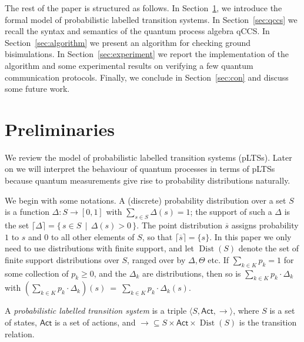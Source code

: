 \documentclass[a4paper,UKenglish,cleveref, autoref]{lipics-v2019}
\newcommand{\dist}[1]{\mathop{Dist} ({#1})   } %
\newcommand{\pdist}[1]{\overline{#1}  } %
\newcommand{\support}[1]{\lceil{#1}\rceil}
\newcommand{\Act}{\ensuremath{\mathsf{Act}}\xspace}
\newcommand{\setof}[2]{\{ \, #1 \, \mid \, #2 \, \}}%
\begin{document}
The rest of the paper is structured as follows. In Section~\ref{sec:plts}, we introduce the formal model
of probabilistic labelled transition systems. In Section~\ref{sec:qccs} we recall the syntax and semantics of the quantum process algebra qCCS. In Section~\ref{sec:algorithm} we present an algorithm for checking ground bisimulations. In Section~\ref{sec:experiment} we report the implementation of the algorithm and some experimental results on verifying a few quantum communication protocols. Finally, we conclude in Section~\ref{sec:con} and discuss some future work.

\section{Preliminaries}
\label{sec:plts}
We review the model of probabilistic labelled
transition systems (pLTSs). Later on we will interpret the behaviour
of quantum processes in terms of pLTSs because quantum measurements give rise to probability distributions naturally.

We begin with some notations. A (discrete) probability distribution
over a set $S$ is a function $\Delta : S \rightarrow [0, 1] $ with
$\sum_{s\in S} \Delta(s) = 1$; the support of such a $\Delta$ is
the set $\support{\Delta} = \setof{s \in S}{\Delta(s) > 0}$.
The point distribution $\pdist{s}$ assigns probability
$1$ to $s$ and $0$ to all other elements of $S$, so that
$\support{\pdist{s}} = \{s\}$. In this paper we only need to use distributions with finite support, and let $\dist{S}$ denote the set of
finite support distributions over $S$, ranged over by $\Delta,\Theta$ etc.
If $\sum_{k \in K} p_k = 1$ for some
collection of  $p_k \geq 0$, and the $\Delta_k$ are distributions,
then so is $\sum_{k \in K}p_k \cdot \Delta_k$ with
$(\sum_{k \in K}p_k \cdot \Delta_k)(s)~=~\sum_{k\in K} p_k\cdot \Delta_k(s).$


\begin{definition}\label{def:LTS}
	A \emph{probabilistic labelled transition system}
	is a triple
	$\langle S, \Act,  \rightarrow  \rangle$, where
	$S$ is a set of states,
	$\Act$ is a set of actions, and $\rightarrow \subseteq
	S \times \Act \times \dist{S}$ is the transition relation.
\end{definition}
\end{document}
